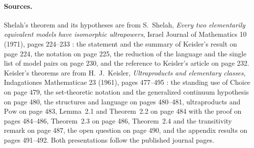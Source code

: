 \paragraph{Sources.}
Shelah's theorem and its hypotheses are from S.~Shelah, \emph{Every two
elementarily equivalent models have isomorphic ultrapowers}, Israel Journal
of Mathematics 10 (1971), pages 224--233 \cite{Shelah1971Ultrapowers}: the
statement and the summary of Keisler's result on page 224, the notation on
page 225, the reduction of the language and the single list of model pairs on
page 230, and the reference to Keisler's article on page 232.  Keisler's
theorems are from H.~J.~Keisler, \emph{Ultraproducts and elementary
classes}, Indagationes Mathematicae 23 (1961), pages 477--495
\cite{Keisler1961ElementaryClasses}: the standing use of Choice on page 479,
the set-theoretic notation and the generalized continuum hypothesis on
page 480, the structures and language on pages 480--481, ultraproducts and
\(\mathrm{Pow}\) on page 483, Lemma~2.1 and Theorem~2.2 on page 484 with
the proof on pages 484--486, Theorem~2.3 on page 486, Theorem~2.4 and the
transitivity remark on page 487, the open question on page 490, and the
appendix results on pages 491--492.  Both presentations follow the published
journal pages.
